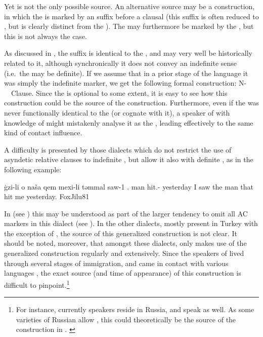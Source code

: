 Yet   is not the only possible source. An alternative source may be a \Sor construction, in which the \prim is marked by an  suffix before a clausal \secn (this suffix is often reduced to , but is clearly distinct from the \ez* {}). The \secn may furthermore be marked by the \rel* {}, but this is not always the case.

As discussed in , the   suffix is identical to the , and may very well be historically related to it, although synchronically it does not convey an indefinite sense (i.e.\ the \prim may be definite). If we assume that in a prior stage of the language it was simply the indefinite marker, we get the following formal construction: N-\indef\ \opt\rel\ Clause. Since the \rel* is optional to some extent, it is easy to see how this construction could be the source of the  construction. Furthermore, even if the  was never functionally identical to the  (or cognate with it), a speaker of  with knowledge of \Sor might mistakenly analyse it as the , leading effectively to the same kind of contact influence.




A difficulty is presented by those dialects which do not restrict the use of asyndetic relative clauses to indefinite \prims, but allow it also with definite \prims, as in the following \Jil example:

{ġzi-li o naša qem mexi-li təmmal}
{saw-1\sg{} .\masc{} man \pst{} hit.\masc{}-\sg{} yesterday}
{I saw the man that hit me yesterday.}
{FoxJilu}{81}

 In \JSan (see ) this may be understood as part of the larger tendency to omit all AC markers in this dialect (see ). In the other dialects, mostly present in Turkey with the exception of \Amd, the source of this generalized construction is not clear.  It should be noted, moreover, that amongst these dialects, only \Boh makes use of the generalized  construction regularly and extensively. Since the speakers of \Boh lived through several stages of immigration, and came in contact with various languages \citep[3--5]{FoxBohtan}, the exact source (and time of appearance) of this construction is difficult to pinpoint.\footnote{For instance, currently \Boh speakers reside in Russia, and speak  as well. As some varieties of Russian allow  \citep[397]{MurelliRelative}, this could theoretically be the source of the construction in \Boh. \label{ft:Boh_Russian}}

